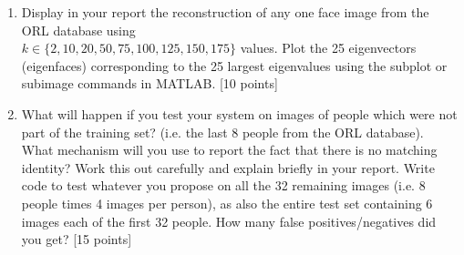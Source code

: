 \documentclass[11pt]{article}
\begin{document}
\begin{enumerate}
\item Display in your report the reconstruction of any one face image from the ORL database using \\ $k \in \{2,10,20,50,75,100,125, 150,175\}$ values. Plot the 25 eigenvectors (eigenfaces) corresponding to the 25 largest eigenvalues using the subplot or subimage commands in MATLAB. \textsf{[10 points]}

\item What will happen if you test your system on images of people which were not part of the training set? (i.e. the last 8 people from the ORL database). What mechanism will you use to report the fact that there is no matching identity? Work this out carefully and explain briefly in your report. Write code to test whatever you propose on all the 32 remaining images (i.e. 8 people times 4 images per person), as also the entire test set containing 6 images each of the first 32 people. How many false positives/negatives did you get? \textsf{[15 points]}

\end{enumerate}
\end{document}
